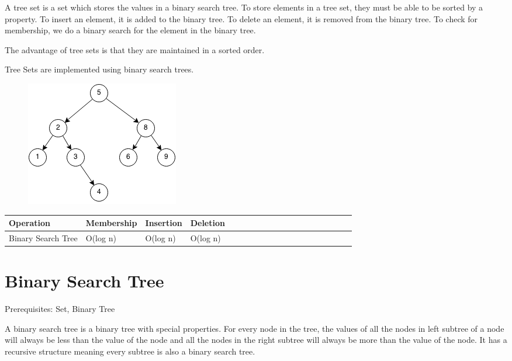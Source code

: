 \documentclass[11pt,oneside]{book}
\makeatletter
\def\maxwidth#1{\ifdim\Gin@nat@width>#1 #1\else\Gin@nat@width\fi}
\makeatother
\begin{document}
A tree set is a set which stores the values in a binary search tree. To store elements in a tree set, they must be able to be sorted by a property. To insert an element, it is added to the binary tree. To delete an element, it is removed from the binary tree. To check for membership, we do a binary search for the element in the binary tree.

The advantage of tree sets is that they are maintained in a sorted order.

Tree Sets are implemented using binary search trees.

\vspace{5px}\begin{figure}[H]\centering
        \includegraphics[width=0.66\maxwidth{\textwidth}]{bst.png}
        \end{figure}


        

\begin{center}\begin{tabulary}{0.4\linewidth}{|l|l|l|l|l|l|l|l|l|l|l|l|l|l|l|l|l|l|l}\hline


  Operation &
  Membership &
  Insertion &
  Deletion\\
\hline


  Binary Search Tree &
  O(log n) &
  O(log n) &
  O(log n)\\

\hline\end{tabulary}\end{center}


        \section{ Binary Search Tree }
        

Prerequisites: Set, Binary Tree

A binary search tree is a  binary tree with special properties. For every node in the tree, the values of all the nodes in left subtree of a node will always be less than the value of the node and all the nodes in the right subtree will always be more than the value of the node. It has a recursive structure meaning every subtree is also a binary search tree.
\end{document}
